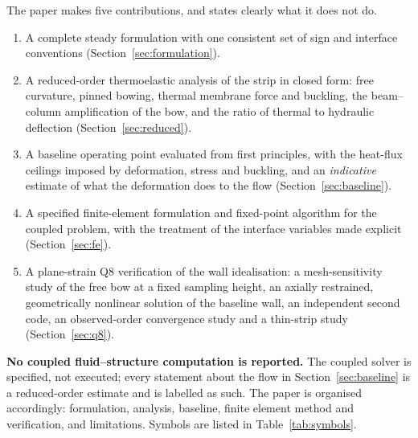 The paper makes five contributions, and states clearly what it does not do.
\begin{enumerate}
\item A complete steady formulation with one consistent set of sign and interface conventions
(Section~\ref{sec:formulation}).
\item A reduced-order thermoelastic analysis of the strip in closed form: free curvature,
pinned bowing, thermal membrane force and buckling, the beam--column amplification of the bow, and
the ratio of thermal to hydraulic deflection (Section~\ref{sec:reduced}).
\item A baseline operating point evaluated from first principles, with the heat-flux ceilings
imposed by deformation, stress and buckling, and an \emph{indicative} estimate of what the
deformation does to the flow (Section~\ref{sec:baseline}).
\item A specified finite-element formulation and fixed-point algorithm for the coupled problem, with
the treatment of the interface variables made explicit (Section~\ref{sec:fe}).
\item A plane-strain Q8 verification of the wall idealisation: a mesh-sensitivity study of the free bow at a
fixed sampling height, an axially restrained, geometrically nonlinear solution of the baseline wall, an
independent second code, an observed-order convergence study and a thin-strip study
(Section~\ref{sec:q8}).
\end{enumerate}
\textbf{No coupled fluid--structure computation is reported.} The coupled solver is specified, not
executed; every statement about the flow in Section~\ref{sec:baseline} is a reduced-order estimate
and is labelled as such. The paper is organised accordingly: formulation, analysis, baseline, finite
element method and verification, and limitations. Symbols are listed in Table~\ref{tab:symbols}.
